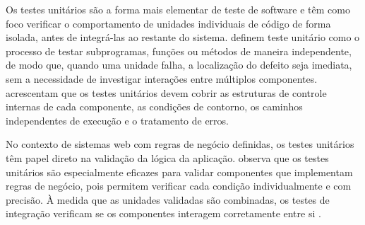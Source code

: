 Os testes unitários são a forma mais elementar de teste de software e têm como foco verificar o comportamento de unidades individuais de código de forma isolada, antes de integrá-las ao restante do sistema.  definem teste unitário como o processo de testar subprogramas, funções ou métodos de maneira independente, de modo que, quando uma unidade falha, a localização do defeito seja imediata, sem a necessidade de investigar interações entre múltiplos componentes.  acrescentam que os testes unitários devem cobrir as estruturas de controle internas de cada componente, as condições de contorno, os caminhos independentes de execução e o tratamento de erros.

No contexto de sistemas web com regras de negócio definidas, os testes unitários têm papel direto na validação da lógica da aplicação.  observa que os testes unitários são especialmente eficazes para validar componentes que implementam regras de negócio, pois permitem verificar cada condição individualmente e com precisão. À medida que as unidades validadas são combinadas, os testes de integração verificam se os componentes interagem corretamente entre si \cite{pressman2016}.

